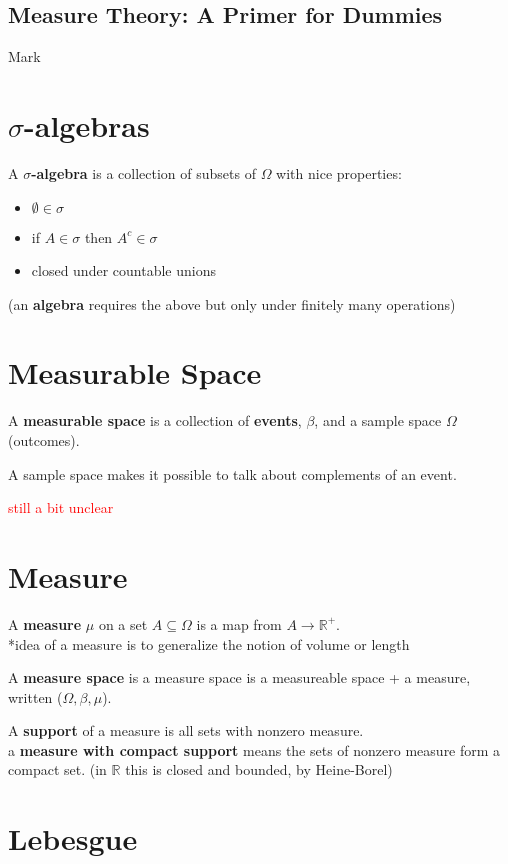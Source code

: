 \documentclass[a4paper, 12pt]{article}
\title{}
\date{}
\def\R{\ensuremath{\mathbb{R}}} %
\newcommand{\bt}[1]{\textbf{#1}} %
\newcommand{\gray}[1]{\textcolor[gray]{0.5}{#1}} %
\begin{document}
\begin{center}
\section*{Measure Theory: A Primer for Dummies}
Mark \\
\end{center}

\section{$\sigma$-algebras}
A \bt{$\sigma$-algebra} is a collection of subsets of $\Omega$ with nice properties:
\begin{itemize}
    \item $\emptyset \in \sigma$
    \item if $A \in \sigma$ then $A^c \in \sigma$
    \item closed under countable unions 
\end{itemize}
(an \bt{algebra} requires the above but only under finitely many operations)



\section{Measurable Space}
A \bt{measurable space} is a collection of \bt{events}, $\beta$, and a sample space $\Omega$ (outcomes).


\gray{A sample space makes it possible to talk about complements of an event.}

\textcolor{red}{still a bit unclear}


\section{Measure}
A \bt{measure} $\mu$ on a set $A \subseteq \Omega$ is a map from $A \rightarrow \R^+$.\\
\gray{*idea of a measure is to generalize the notion of volume or length}

A \bt{measure space} is a measure space is a measureable space + a measure, written ($\Omega, \beta, \mu$).

A \bt{support} of a measure is all sets with nonzero measure. \\
a \bt{measure with compact support} means the sets of nonzero measure form a compact set.
(in $\R$ this is closed and bounded, by Heine-Borel)

\section{Lebesgue}
\end{document}
